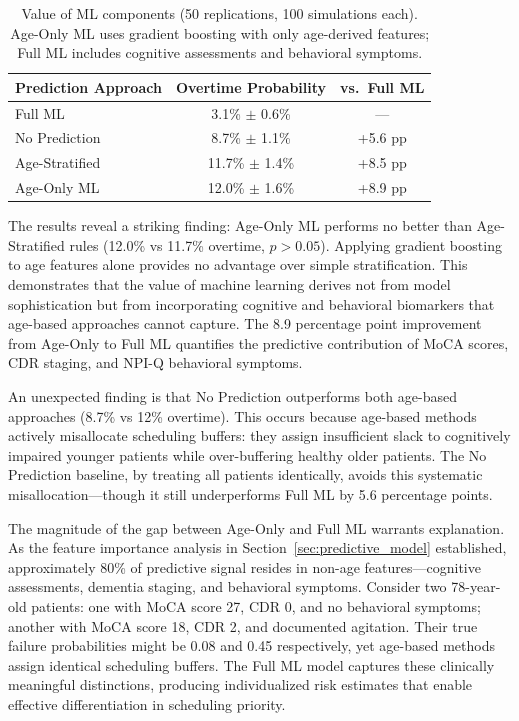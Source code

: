 \documentclass[11pt,a4paper]{article}
\begin{document}
\begin{table}[htbp]
\centering
\caption{Value of ML components (50 replications, 100 simulations each). Age-Only ML uses gradient boosting with only age-derived features; Full ML includes cognitive assessments and behavioral symptoms.}
\label{tab:ml_value}
\begin{tabular}{@{}lcc@{}}
\toprule
\textbf{Prediction Approach} & \textbf{Overtime Probability} & \textbf{vs.\ Full ML} \\
\midrule
Full ML & 3.1\% $\pm$ 0.6\% & --- \\
No Prediction & 8.7\% $\pm$ 1.1\% & +5.6 pp \\
Age-Stratified & 11.7\% $\pm$ 1.4\% & +8.5 pp \\
Age-Only ML & 12.0\% $\pm$ 1.6\% & +8.9 pp \\
\bottomrule
\end{tabular}
\end{table}

The results reveal a striking finding: Age-Only ML performs no better than Age-Stratified rules (12.0\% vs 11.7\% overtime, $p > 0.05$). Applying gradient boosting to age features alone provides no advantage over simple stratification. This demonstrates that the value of machine learning derives not from model sophistication but from incorporating cognitive and behavioral biomarkers that age-based approaches cannot capture. The 8.9 percentage point improvement from Age-Only to Full ML quantifies the predictive contribution of MoCA scores, CDR staging, and NPI-Q behavioral symptoms.

An unexpected finding is that No Prediction outperforms both age-based approaches (8.7\% vs 12\% overtime). This occurs because age-based methods actively misallocate scheduling buffers: they assign insufficient slack to cognitively impaired younger patients while over-buffering healthy older patients. The No Prediction baseline, by treating all patients identically, avoids this systematic misallocation---though it still underperforms Full ML by 5.6 percentage points.

The magnitude of the gap between Age-Only and Full ML warrants explanation. As the feature importance analysis in Section~\ref{sec:predictive_model} established, approximately 80\% of predictive signal resides in non-age features---cognitive assessments, dementia staging, and behavioral symptoms. Consider two 78-year-old patients: one with MoCA score 27, CDR 0, and no behavioral symptoms; another with MoCA score 18, CDR 2, and documented agitation. Their true failure probabilities might be 0.08 and 0.45 respectively, yet age-based methods assign identical scheduling buffers. The Full ML model captures these clinically meaningful distinctions, producing individualized risk estimates that enable effective differentiation in scheduling priority.
\end{document}
